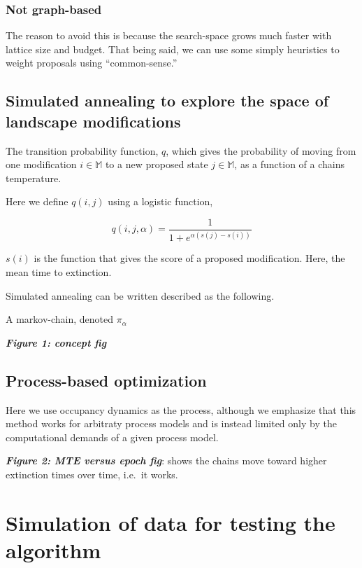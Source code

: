 \documentclass[11pt]{article}
\begin{document}
\hypertarget{not-graph-based}{%
\subsubsection{Not graph-based}\label{not-graph-based}}

The reason to avoid this is because the search-space grows much faster
with lattice size and budget. That being said, we can use some simply
heuristics to weight proposals using ``common-sense.''

\hypertarget{simulated-annealing-to-explore-the-space-of-landscape-modifications}{%
\subsection{Simulated annealing to explore the space of landscape
modifications}\label{simulated-annealing-to-explore-the-space-of-landscape-modifications}}

The transition probability function, \(q\), which gives the probability
of moving from one modification \(i \in \mathbb{M}\) to a new proposed
state \(j \in \mathbb{M}\), as a function of a chains temperature.

Here we define \(q(i,j)\) using a logistic function,

\[q(i,j, \alpha) = \frac{1}{1 + e^{\alpha (s(j) - s(i))}}\]

\(s(i)\) is the function that gives the score of a proposed
modification. Here, the mean time to extinction.

Simulated annealing can be written described as the following.

A markov-chain, denoted \(\pi_\alpha\)

\textbf{\emph{Figure 1: concept fig}}

\hypertarget{process-based-optimization}{%
\subsection{Process-based
optimization}\label{process-based-optimization}}

Here we use occupancy dynamics as the process, although we emphasize
that this method works for arbitraty process models and is instead
limited only by the computational demands of a given process model.

\textbf{\emph{Figure 2: MTE versus epoch fig}}: shows the chains move
toward higher extinction times over time, i.e.~it works.

\hypertarget{simulation-of-data-for-testing-the-algorithm}{%
\section{Simulation of data for testing the
algorithm}\label{simulation-of-data-for-testing-the-algorithm}}
\end{document}
